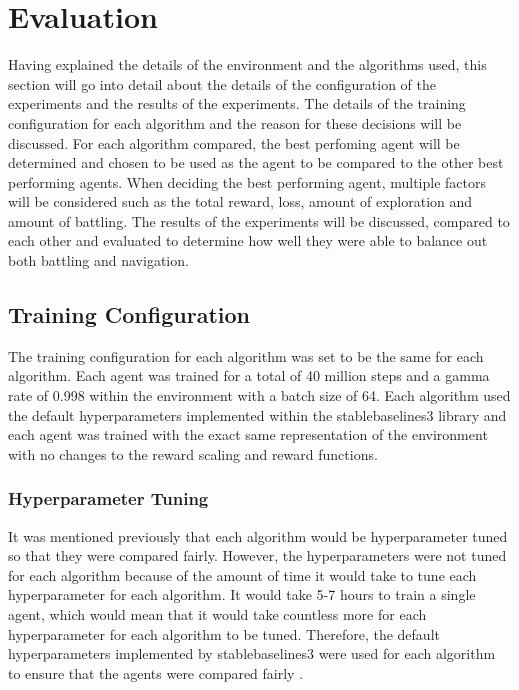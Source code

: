 \section{Evaluation}

Having explained the details of the environment and the algorithms used, this section will go into detail about the details of the configuration of the experiments and the results of the experiments. The details of the training configuration for each algorithm and the reason for these decisions will be discussed. For each algorithm compared, the best perfoming agent will be determined and chosen to be used as the agent to be compared to the other best performing agents. When deciding the best performing agent, multiple factors will be considered such as the total reward, loss, amount of exploration and amount of battling. The results of the experiments will be discussed, compared to each other and evaluated to determine how well they were able to balance out both battling and navigation.

\subsection{Training Configuration}

The training configuration for each algorithm was set to be the same for each algorithm. Each agent was trained for a total of 40 million steps and a gamma rate of 0.998 within the environment with a batch size of 64. Each algorithm used the default hyperparameters implemented within the stablebaselines3 library and each agent was trained with the exact same representation of the environment with no changes to the reward scaling and reward functions. 

\subsubsection{Hyperparameter Tuning}

It was mentioned previously that each algorithm would be hyperparameter tuned so that they were compared fairly. However, the hyperparameters were not tuned for each algorithm because of the amount of time it would take to tune each hyperparameter for each algorithm. It would take 5-7 hours to train a single agent, which would mean that it would take countless more for each hyperparameter for each algorithm to be tuned. Therefore, the default hyperparameters implemented by stablebaselines3 were used for each algorithm to ensure that the agents were compared fairly \cite{stablebaselines3}.

